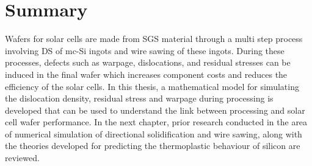 \section{Summary}
Wafers for solar cells are made from SGS material through a multi step process involving DS of mc-Si ingots and wire sawing of these ingots. During these processes, defects such as warpage, dislocations, and residual stresses can be induced in the final wafer which increases component costs and reduces the efficiency of the solar cells. In this thesis, a mathematical model for simulating the dislocation density, residual stress and warpage during processing is developed that can be used to understand the link between processing and solar cell wafer performance. In the next chapter, prior research conducted in the area of numerical simulation of directional solidification and wire sawing, along with the theories developed for predicting the thermoplastic behaviour of silicon are reviewed.